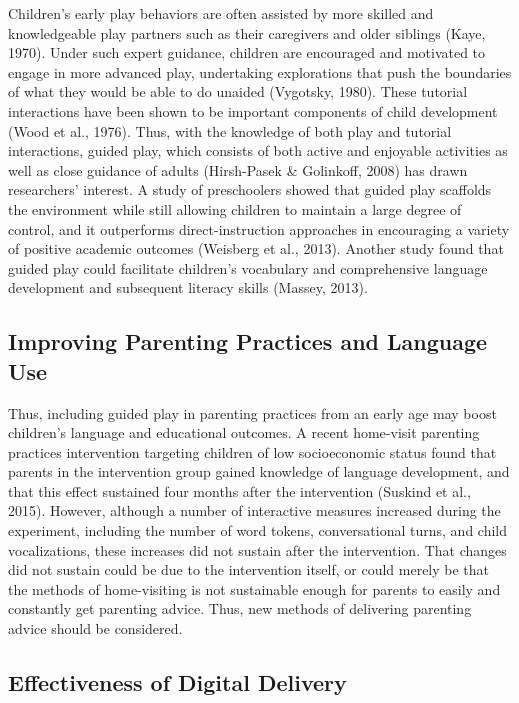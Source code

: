 \documentclass[]{article}
\begin{document}
Children's early play behaviors are often assisted by more skilled and
knowledgeable play partners such as their caregivers and older siblings
(Kaye, 1970). Under such expert guidance, children are encouraged and
motivated to engage in more advanced play, undertaking explorations that
push the boundaries of what they would be able to do unaided (Vygotsky,
1980). These tutorial interactions have been shown to be important
components of child development (Wood et al., 1976). Thus, with the
knowledge of both play and tutorial interactions, guided play, which
consists of both active and enjoyable activities as well as close
guidance of adults (Hirsh-Pasek \& Golinkoff, 2008) has drawn
researchers' interest. A study of preschoolers showed that guided play
scaffolds the environment while still allowing children to maintain a
large degree of control, and it outperforms direct-instruction
approaches in encouraging a variety of positive academic outcomes
(Weisberg et al., 2013). Another study found that guided play could
facilitate children's vocabulary and comprehensive language development
and subsequent literacy skills (Massey, 2013).

\hypertarget{improving-parenting-practices-and-language-use}{%
\subsection{Improving Parenting Practices and Language
Use}\label{improving-parenting-practices-and-language-use}}

Thus, including guided play in parenting practices from an early age may
boost children's language and educational outcomes. A recent home-visit
parenting practices intervention targeting children of low socioeconomic
status found that parents in the intervention group gained knowledge of
language development, and that this effect sustained four months after
the intervention (Suskind et al., 2015). However, although a number of
interactive measures increased during the experiment, including the
number of word tokens, conversational turns, and child vocalizations,
these increases did not sustain after the intervention. That changes did
not sustain could be due to the intervention itself, or could merely be
that the methods of home-visiting is not sustainable enough for parents
to easily and constantly get parenting advice. Thus, new methods of
delivering parenting advice should be considered.

\hypertarget{effectiveness-of-digital-delivery}{%
\subsection{Effectiveness of Digital
Delivery}\label{effectiveness-of-digital-delivery}}
\end{document}
